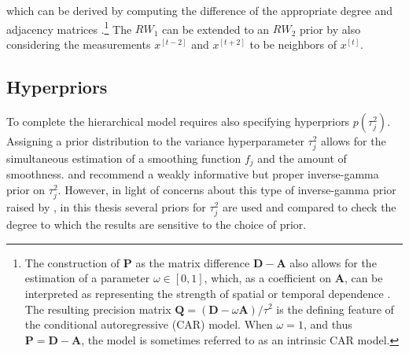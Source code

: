\noindent which can be derived by computing the difference of the appropriate degree and adjacency matrices .\footnote{The construction of $\mathbf{P}$ as the matrix difference $\mathbf{D} - \mathbf{A}$ also allows for the estimation of a parameter $\omega \in [0,1]$, which, as a coefficient on $\mathbf{A}$, can be interpreted as representing the strength of spatial or temporal dependence . The resulting precision matrix $\mathbf{Q}= (\mathbf{D} - \omega \mathbf{A})/\tau^2$ is the defining feature of the conditional autoregressive (CAR) model.  When $\omega = 1$, and thus $\mathbf{P}= \mathbf{D} - \mathbf{A}$, the model is sometimes referred to as an intrinsic CAR model.
} The $RW_1$  can be extended to an $RW_2$ prior by also considering the measurements $x^{[t-2]}$  and $x^{[t+2]}$ to be neighbors of $x^{[t]}$. 


\subsection{Hyperpriors}
\label{hyperpriors}

To complete the hierarchical model requires also specifying hyperpriors $p(\tau_j^2)$.  Assigning a prior distribution to the variance hyperparameter $\tau_j^2$ allows for the simultaneous estimation of a smoothing function $f_j$ and the amount of smoothness.  and  recommend a weakly informative but proper inverse-gamma prior on $\tau_j^2$. However, in light of concerns about this type of inverse-gamma prior raised by , in this thesis several priors for $\tau^2_j$ are used and compared to check the degree to which the results are sensitive to the choice of prior.

